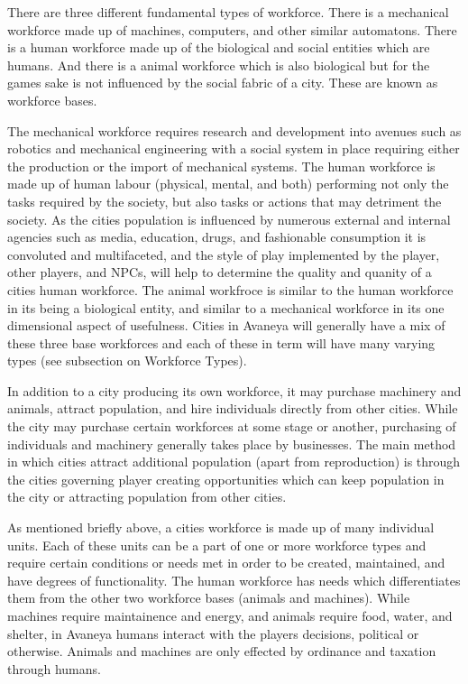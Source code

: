 There are three different fundamental types of workforce. There is a mechanical workforce made up of machines, computers, and other similar automatons. There is a human workforce made up of the biological and social entities which are humans. And there is a animal workforce which is also biological but for the games sake is not influenced by the social fabric of a city. These are known as workforce bases. 

The mechanical workforce requires research and development into avenues such as robotics and mechanical engineering with a social system in place requiring either the production or the import of mechanical systems. The human workforce is made up of human labour (physical, mental, and both) performing not only the tasks required by the society, but also tasks or actions that may detriment the society. As the cities population is influenced by numerous external and internal agencies such as media, education, drugs, and fashionable consumption it is convoluted and multifaceted, and the style of play implemented by the player, other players, and NPCs, will help to determine the quality and quanity of a cities human workforce. The animal workfroce is similar to the human workforce in its being a biological entity, and similar to a mechanical workforce in its one dimensional aspect of usefulness. Cities in Avaneya will generally have a mix of these three base workforces and each of these in term will have many varying types (see subsection on Workforce Types). 

In addition to a city producing its own workforce, it may purchase machinery and animals, attract population, and hire individuals directly from other cities. While the city may purchase certain workforces at some stage or another, purchasing of individuals and machinery generally takes place by businesses. The main method in which cities attract additional population (apart from reproduction) is through the cities governing player creating opportunities which can keep population in the city or attracting population from other cities. 


As mentioned briefly above, a cities workforce is made up of many individual units. Each of these units can be a part of one or more workforce types and require certain conditions or needs met in order to be created, maintained, and have degrees of functionality. The human workforce has needs which differentiates them from the other two workforce bases (animals and machines). While machines require maintainence and energy, and animals require food, water, and shelter, in Avaneya humans interact with the players decisions, political or otherwise. Animals and machines are only effected by ordinance and taxation through humans. 

